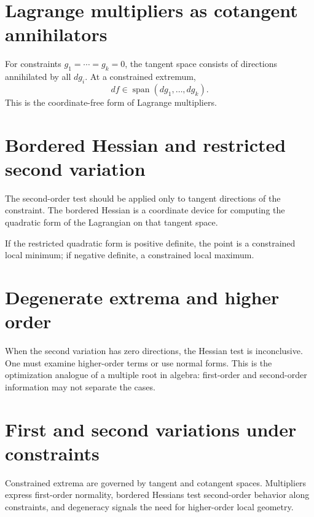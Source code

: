 \section{Lagrange multipliers as cotangent annihilators}

For constraints \(g_1=\cdots=g_k=0\), the tangent space consists of directions annihilated by all \(dg_i\).  At a constrained extremum,
\[
  df\in \operatorname{span}(dg_1,\ldots,dg_k).
\]
This is the coordinate-free form of Lagrange multipliers.

\section{Bordered Hessian and restricted second variation}

The second-order test should be applied only to tangent directions of the constraint.  The bordered Hessian is a coordinate device for computing the quadratic form of the Lagrangian on that tangent space.

If the restricted quadratic form is positive definite, the point is a constrained local minimum; if negative definite, a constrained local maximum.

\section{Degenerate extrema and higher order}

When the second variation has zero directions, the Hessian test is inconclusive.  One must examine higher-order terms or use normal forms.  This is the optimization analogue of a multiple root in algebra: first-order and second-order information may not separate the cases.

\section{First and second variations under constraints}

Constrained extrema are governed by tangent and cotangent spaces.  Multipliers express first-order normality, bordered Hessians test second-order behavior along constraints, and degeneracy signals the need for higher-order local geometry.

